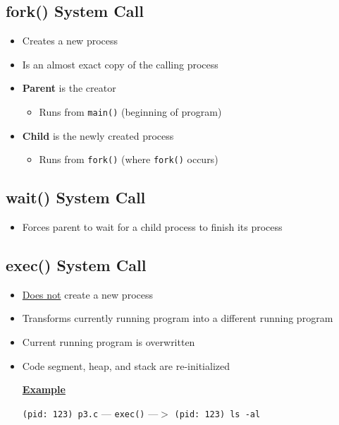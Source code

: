 \documentclass[12pt]{article}
\begin{document}
\begin{mdframed}
\end{mdframed}

\subsection{fork() System Call}
\begin{itemize}
    \item Creates a new process
    \item Is an almost exact copy of the calling process
    \item \textbf{Parent} is the creator
    \begin{itemize}
        \item Runs from \texttt{main()} (beginning of program)
    \end{itemize}
    \item \textbf{Child} is the newly created process
    \begin{itemize}
        \item Runs from \texttt{fork()} (where \texttt{fork()} occurs)
    \end{itemize}
\end{itemize}

\subsection{wait() System Call}
\begin{itemize}
    \item Forces parent to wait for a child process to finish its process
\end{itemize}

\subsection{exec() System Call}
\begin{itemize}
    \item \underline{Does not} create a new process
    \item Transforms currently running program into a different running program
    \item Current running program is overwritten
    \item Code segment, heap, and stack are re-initialized

    \bigskip

    \underline{\textbf{Example}}

    \bigskip

    \texttt{(pid: 123) p3.c} --- \texttt{exec()} ---$>$ \texttt{(pid: 123) ls -al}

\end{itemize}
\end{document}
